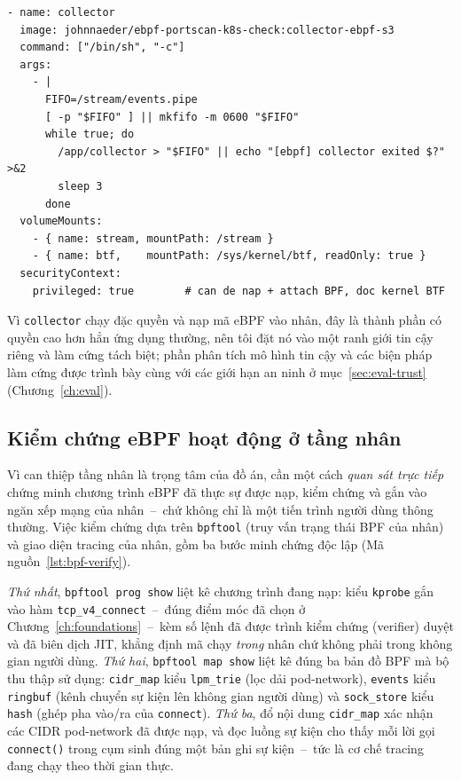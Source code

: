 \begin{lstlisting}[language={},caption={Trích \texttt{DaemonSet} thu thập: tạo FIFO, vòng tự khởi động lại, quyền đặc quyền nạp eBPF (\texttt{23-pipeline-ebpf.yaml}).},label={lst:collector-ds}]
- name: collector
  image: johnnaeder/ebpf-portscan-k8s-check:collector-ebpf-s3
  command: ["/bin/sh", "-c"]
  args:
    - |
      FIFO=/stream/events.pipe
      [ -p "$FIFO" ] || mkfifo -m 0600 "$FIFO"
      while true; do
        /app/collector > "$FIFO" || echo "[ebpf] collector exited $?" >&2
        sleep 3
      done
  volumeMounts:
    - { name: stream, mountPath: /stream }
    - { name: btf,    mountPath: /sys/kernel/btf, readOnly: true }
  securityContext:
    privileged: true        # can de nap + attach BPF, doc kernel BTF
\end{lstlisting}

Vì \texttt{collector} chạy đặc quyền và nạp mã eBPF vào nhân, đây là thành phần có quyền
cao hơn hẳn ứng dụng thường, nên tôi đặt nó vào một ranh giới tin cậy riêng và làm cứng
tách biệt; phần phân tích mô hình tin cậy và các biện pháp làm cứng được trình bày cùng
với các giới hạn an ninh ở mục~\ref{sec:eval-trust} (Chương~\ref{ch:eval}).

\subsection{Kiểm chứng eBPF hoạt động ở tầng nhân}
\label{subsec:impl-collector-verify}

Vì can thiệp tầng nhân là trọng tâm của đồ án, cần một cách \emph{quan sát trực tiếp}
chứng minh chương trình eBPF đã thực sự được nạp, kiểm chứng và gắn vào ngăn xếp mạng
của nhân~--~chứ không chỉ là một tiến trình người dùng thông thường. Việc kiểm chứng dựa
trên \texttt{bpftool} (truy vấn trạng thái BPF của nhân) và giao diện tracing của nhân,
gồm ba bước minh chứng độc lập (Mã nguồn~\ref{lst:bpf-verify}).

\emph{Thứ nhất}, \texttt{bpftool prog show} liệt kê chương trình đang nạp: kiểu
\texttt{kprobe} gắn vào hàm \texttt{tcp\_v4\_connect}~--~đúng điểm móc đã chọn ở
Chương~\ref{ch:foundations}~--~kèm số lệnh đã được trình kiểm chứng (verifier) duyệt và
đã biên dịch JIT, khẳng định mã chạy \emph{trong} nhân chứ không phải trong không gian
người dùng. \emph{Thứ hai}, \texttt{bpftool map show} liệt kê đúng ba bản đồ BPF mà bộ
thu thập sử dụng: \texttt{cidr\_map} kiểu \texttt{lpm\_trie} (lọc dải pod-network),
\texttt{events} kiểu \texttt{ringbuf} (kênh chuyển sự kiện lên không gian người dùng) và
\texttt{sock\_store} kiểu \texttt{hash} (ghép pha vào/ra của \texttt{connect}).
\emph{Thứ ba}, đổ nội dung \texttt{cidr\_map} xác nhận các CIDR pod-network đã được nạp,
và đọc luồng sự kiện cho thấy mỗi lời gọi \texttt{connect()} trong cụm sinh đúng một bản
ghi sự kiện~--~tức là cơ chế tracing đang chạy theo thời gian thực.


